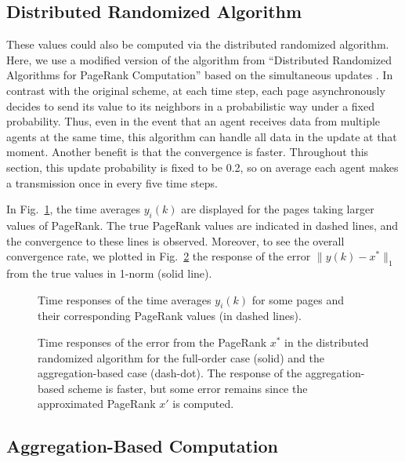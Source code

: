 \documentclass[11pt,draftcls,onecolumn]{IEEEtran}
\newcommand{\fig}[3]{\resizebox{#1}{#2}{\texttt{[image: \#3]}}}
\begin{document}
\subsection*{Distributed Randomized Algorithm}

These values could also be computed via the distributed randomized algorithm.
Here, we use a modified version of the algorithm from 
``Distributed Randomized Algorithms for PageRank Computation''
based on the simultaneous updates \cite{IshTem:10}. 
In contrast with the original scheme,  
at each time step,
each page asynchronously decides to send its value to its neighbors 
in a probabilistic way under a fixed probability. 
Thus, even in the event that an agent receives data from
multiple agents at the same time, this algorithm can handle all data in
the update at that moment.
Another benefit is that the convergence is faster. 
Throughout this section, this update
probability is fixed to be 0.2, so on average each agent makes a transmission
once in every five time steps. 


In Fig.~\ref{fig:timeresp_y}, the time averages $y_i(k)$
are displayed for the pages taking larger values of PageRank. The true PageRank values
are indicated in dashed lines, and the convergence to these lines is observed.
Moreover, to see the overall convergence rate, we plotted in Fig.~\ref{fig:timeresp_err1}
the response of the error $\|y(k)-x^*\|_1$ from the true values in 1-norm (solid line).


\begin{figure}[t]
  \centering
  \fig{9cm}{!}{timeresp_alpha02a.eps}
  \caption{Time responses of the time averages $y_i(k)$ for some pages and
       their corresponding PageRank values (in dashed lines).}
  \label{fig:timeresp_y}
\end{figure}


\begin{figure}[t]
  \centering
  \fig{9cm}{!}{timeresp_err_alpha02_full_agg.eps}
  \caption{Time responses of the error from the PageRank $x^*$ in the distributed randomized algorithm 
             for the full-order case (solid) and the aggregation-based case (dash-dot).
             The response of the aggregation-based scheme is faster, but some error remains
             since the approximated PageRank $x'$ is computed.}
  \label{fig:timeresp_err1}
\end{figure}

\subsection*{Aggregation-Based Computation}
\end{document}
